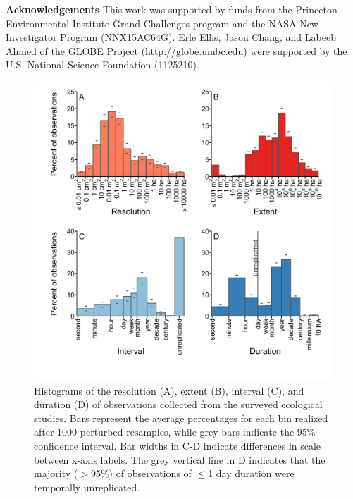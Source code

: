 \documentclass[12pt]{article}
\begin{document}



\noindent \textbf{Acknowledgements} This work was supported by funds from the Princeton Environmental Institute Grand Challenges program and the NASA New Investigator Program (NNX15AC64G). Erle Ellis, Jason Chang, and Labeeb Ahmed of the GLOBE Project (http://globe.umbc.edu) were supported by the U.S. National Science Foundation (1125210).
\clearpage


\begin{figure}[!ht]
\includegraphics[width=1\textwidth]{../vignettes/figures/fig1.png}
\vspace{-0.15 cm}
\caption{Histograms of the resolution (A), extent (B), interval (C), and duration (D) of observations collected from the surveyed ecological studies. Bars represent the average percentages for each bin realized after 1000 perturbed resamples, while grey bars indicate the 95\% confidence interval. Bar widths in C-D indicate differences in scale between x-axis labels. The grey vertical line in D indicates that the majority ($>$95\%) of observations of $\leq$1 day duration were temporally unreplicated.}
\label{afoto1}
\end{figure}
\end{document}
